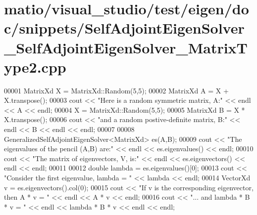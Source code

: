 \hypertarget{matio_2visual__studio_2test_2eigen_2doc_2snippets_2_self_adjoint_eigen_solver___self_adjoint_eigen_solver___matrix_type2_8cpp_source}{}\section{matio/visual\+\_\+studio/test/eigen/doc/snippets/\+Self\+Adjoint\+Eigen\+Solver\+\_\+\+Self\+Adjoint\+Eigen\+Solver\+\_\+\+Matrix\+Type2.cpp}
\label{matio_2visual__studio_2test_2eigen_2doc_2snippets_2_self_adjoint_eigen_solver___self_adjoint_eigen_solver___matrix_type2_8cpp_source}

\begin{DoxyCode}
00001 MatrixXd X = MatrixXd::Random(5,5);
00002 MatrixXd A = X + X.transpose();
00003 cout << \textcolor{stringliteral}{"Here is a random symmetric matrix, A:"} << endl << A << endl;
00004 X = MatrixXd::Random(5,5);
00005 MatrixXd B = X * X.transpose();
00006 cout << \textcolor{stringliteral}{"and a random postive-definite matrix, B:"} << endl << B << endl << endl;
00007 
00008 GeneralizedSelfAdjointEigenSolver<MatrixXd> es(A,B);
00009 cout << \textcolor{stringliteral}{"The eigenvalues of the pencil (A,B) are:"} << endl << es.eigenvalues() << endl;
00010 cout << \textcolor{stringliteral}{"The matrix of eigenvectors, V, is:"} << endl << es.eigenvectors() << endl << endl;
00011 
00012 \textcolor{keywordtype}{double} lambda = es.eigenvalues()[0];
00013 cout << \textcolor{stringliteral}{"Consider the first eigenvalue, lambda = "} << lambda << endl;
00014 VectorXd v = es.eigenvectors().col(0);
00015 cout << \textcolor{stringliteral}{"If v is the corresponding eigenvector, then A * v = "} << endl << A * v << endl;
00016 cout << \textcolor{stringliteral}{"... and lambda * B * v = "} << endl << lambda * B * v << endl << endl;
\end{DoxyCode}
